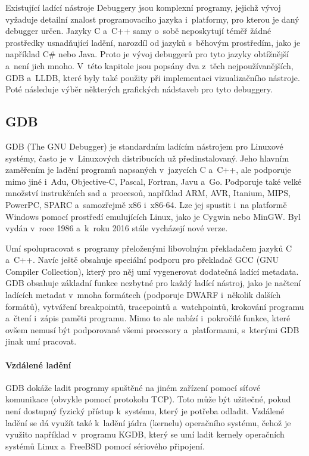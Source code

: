 \documentclass[czech,bachelor,male,python,dept460,hidelinks]{diploma}						%
\newcommand{\parspace}[1][]{
	\ifthenelse{\isempty{#1}}{\vspace{0mm}}{\vspace{#1}}
	\par
}
\begin{document}
\begin{section}{Existující ladící nástroje}
\label{sec:ExistingDebuggers}
	Debuggery jsou komplexní programy, jejichž vývoj vyžaduje detailní znalost programovacího jazyka i~platformy, pro kterou je daný debugger určen.
	Jazyky C a~C++ samy o~sobě neposkytují téměř žádné prostředky usnadňující ladění, narozdíl od jazyků s~běhovým prostředím, jako je například C\# nebo Java.
	Proto je vývoj debuggerů pro tyto jazyky obtížnější a~není jich mnoho. V~této kapitole jsou popsány dva z~těch nejpoužívanějších,
	GDB a~LLDB, které byly také použity při implementaci vizualizačního nástroje. Poté následuje výběr některých grafických nádstaveb pro tyto debuggery.

	\subsection{GDB}
		GDB (The GNU Debugger) je standardním ladícím nástrojem pro Linuxové systémy, často je v~Linuxových distribucích už předinstalovaný.
		Jeho hlavním zaměřením je ladění programů napsaných v~jazycích C a~C++, ale podporuje mimo jiné i~Adu, Objective-C, Pascal, Fortran, Javu
		a~Go. \cite{gdb-languages} Podporuje také velké množství instrukčních sad a~procesoů, například ARM, AVR, Itanium, MIPS, PowerPC, SPARC
		a~samozřejmě x86 i~x86-64. Lze jej spustit i~na platformě Windows pomocí prostředí emulujících Linux, jako je Cygwin nebo MinGW.
		Byl vydán v~roce 1986 a~k~roku 2016 stále vycházejí nové verze.
		
		\parspace Umí spolupracovat s~programy přeloženými libovolným překladačem jazyků C a~C++. Navíc ještě obsahuje
		speciální podporu pro překladač GCC (GNU Compiler Collection), který pro něj umí vygenerovat dodatečná ladící metadata.
		GDB obsahuje základní funkce nezbytné pro každý ladící nástroj, jako je načtení ladících metadat v~mnoha formátech (podporuje DWARF i~několik dalších
		formátů), vytváření breakpointů, tracepointů a~watchpointů, krokování programu a~čtení i~zápis paměti programu.
		Mimo to ale nabízí i~pokročilé funkce, které ovšem nemusí být podporované všemi procesory a~platformami, s~kterými GDB jinak umí pracovat.
		
		\paragraph*{Vzdálené ladění}
			GDB dokáže ladit programy spuštěné na jiném zařízení pomocí síťové komunikace (obvykle pomocí protokolu TCP).
			Toto může být užitečné, pokud není dostupný fyzický přístup k~systému, který je potřeba odladit.
			Vzdálené ladění se dá využít také k~ladění jádra (kernelu) operačního systému, čehož je využito například v~programu KGDB, který se umí ladit
			kernely operačních systémů Linux a~FreeBSD pomocí sériového připojení.

\end{section}
\end{document}
